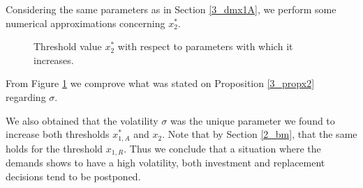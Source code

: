 Considering the same parameters as in Section \ref{3_dmx1A}, we perform some numerical approximations concerning $x_2^*$.

\begin{figure}[!htb]
	\begin{subfigmatrix}{1}
	\end{subfigmatrix}
	\caption{Threshold value $x^*_2$ with respect to parameters with which it increases.}
	\label{fig:2_x2i}
\end{figure}

From Figure \ref{fig:2_x2i} we comprove what was stated on Proposition \ref{3_propx2} regarding $\sigma$. 

We also obtained that the volatility $\sigma$ was the unique parameter we found to increase both thresholds $x_{1,A}^*$ and $x_2$. Note that by Section \ref{2_bm}, that the same holds for the threshold $x_{1,R}$. Thus we conclude that a situation where the demands shows to have a high volatility, both investment and replacement decisions tend to be postponed.

